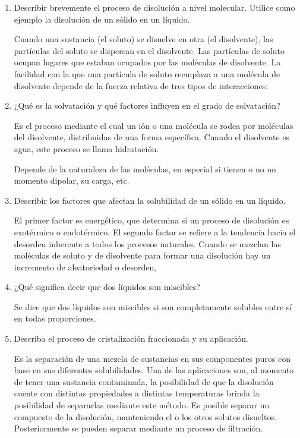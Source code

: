 \documentclass[letterpaper]{article}
\begin{document}
\begin{enumerate}
	\item Describir brevemente el proceso de disolución a nivel molecular. Utilice como ejemplo la disolución de un sólido en un líquido.

		Cuando una sustancia (el soluto) se disuelve en otra (el disolvente), las partículas del soluto se dispersan en el disolvente. Las partículas de soluto ocupan lugares que estaban ocupados por las moléculas de disolvente. La facilidad con la que una partícula de soluto reemplaza a una molécula de disolvente depende de la fuerza relativa de tres tipos de interacciones:

	\item ¿Qué es la solvatación y qué factores influyen en el grado de solvatación?
		
		Es el proceso mediante el cual un ión o una molécula se rodea por moléculas del disolvente, distribuidas de una forma específica. Cuando el disolvente es agua, este proceso se llama hidratación.

		Depende de la naturaleza de las moléculas, en especial si tienen o no un momento dipolar, su carga, etc.

	\item Describir los factores que afectan la solubilidad de un sólido en un líquido.

		El primer factor es energético, que determina si un proceso de disolución es exotérmico o endotérmico. El segundo factor se refiere a la tendencia hacia el desorden inherente a todos los procesos naturales. Cuando se mezclan las moléculas de soluto y de disolvente para formar una disolución hay un incremento de aleatoriedad o desorden,

	\item ¿Qué significa decir que dos líquidos son miscibles?

		Se dice que dos líquidos son miscibles si son completamente solubles entre sí en todas proporciones.

	\item Describa el proceso de cristalización fraccionada y su aplicación.
	
		Es la separación de una mezcla de sustancias en sus componentes puros con base en sus diferentes solubilidades. Una de las aplicaciones son, al momento de tener una sustancia contaminada, la posibilidad de que la disolución cuente con distintas propiedades a distintas temperaturas brinda la posibilidad de separarlas mediante este método. Es posible separar un compuesto de la disolución, manteniendo el o los otros solutos disueltos. Posteriormente se pueden separar mediante un proceso de filtración.

\end{enumerate}
\end{document}
